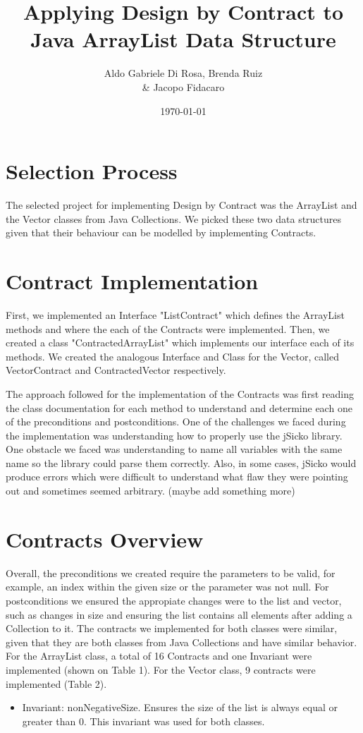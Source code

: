 \documentclass[a4paper]{article}
\title{Applying Design by Contract to \\ Java ArrayList Data Structure}
\author{Aldo Gabriele Di Rosa, Brenda Ruiz \\ \& Jacopo Fidacaro}
\date{\today}
\begin{document}
\maketitle

\section{Selection Process}

The selected project for implementing Design by Contract was the ArrayList and the Vector classes from Java Collections. We picked these two data structures given that their behaviour can be modelled by implementing Contracts. 

\section{Contract Implementation}

First, we implemented an Interface "ListContract" which defines the ArrayList methods and where the each of the Contracts were implemented. Then, we created a class "ContractedArrayList" which implements our interface each of its methods. We created the analogous Interface and Class for the Vector, called VectorContract and ContractedVector respectively. \par
The approach followed for the implementation of the Contracts was first reading the class documentation for each method to understand and determine each one of the preconditions and postconditions. 
One of the challenges we faced during the implementation was understanding how to properly use the jSicko library. One obstacle we faced was understanding to name all variables with the same name so the library could parse them correctly. Also, in some cases, jSicko would produce errors which were difficult to understand what flaw they were pointing out and sometimes seemed arbitrary. (maybe add something more)

\section{Contracts Overview}

Overall, the preconditions we created require the parameters to be valid, for example, an index within the given size or the parameter was not null. For postconditions we ensured the appropiate changes were to the list and vector, such as changes in size and ensuring the list contains all elements after adding a Collection to it.
The contracts we implemented for both classes were similar, given that they are both classes from Java Collections and have similar behavior. 
For the ArrayList class, a total of 16 Contracts and one Invariant were implemented (shown on Table 1). For the Vector class, 9 contracts were implemented (Table 2). 
\begin{itemize}
 \item Invariant: nonNegativeSize. Ensures the size of the list is always equal or greater than 0. This invariant was used for both classes.
\end{itemize}
\end{document}
